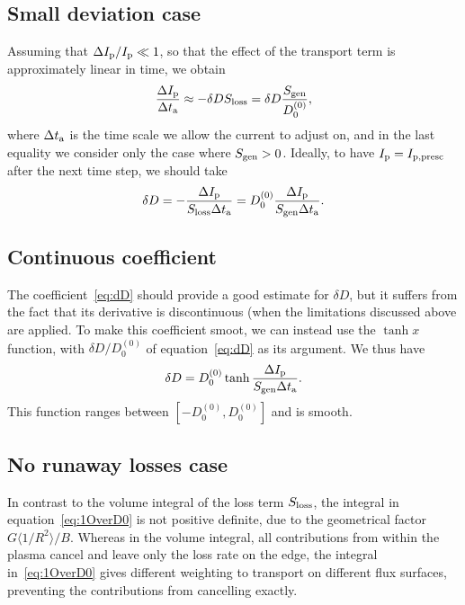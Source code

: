\documentclass{notes}
\begin{document}
	\subsection{Small deviation case}
	Assuming that $\Delta I_{\rm p}/I_{\rm p}\ll 1$, so that the effect of
	the transport term is approximately linear in time, we obtain
	\begin{equation}\label{eq:dD}
		\frac{\Delta I_{\rm p}}{\Delta t_{\rm a}}\approx
			-\delta D S_{\rm loss} = \delta D\frac{S_{\rm gen}}{D_0^{(0)}},
	\end{equation}
	where $\Delta t_{\rm a}$ is the time scale we allow the current to adjust
	on, and in the last equality we consider only the case where $S_{\rm gen}>0$.
	Ideally, to have $I_{\rm p} = I_{\rm p,presc}$ after the next time step, we
	should take
	\begin{equation}
		\delta D = -\frac{\Delta I_{\rm p}}{S_{\rm loss}\Delta t_{\rm a}} = D_0^{(0)} \frac{\Delta I_{\rm p}}{S_{\rm gen}\Delta t_{\rm a}}.
	\end{equation}

	\subsection{Continuous coefficient}
	The coefficient~\eqref{eq:dD} should provide a good estimate for $\delta D$,
	but it suffers from the fact that its derivative is discontinuous (when the
	limitations discussed above are applied. To make this coefficient smoot, we
	can instead use the $\tanh{x}$ function, with $\delta D/D_0^{(0)}$ of
	equation~\eqref{eq:dD} as its argument. We thus have
	\begin{equation}\label{eq:dD_tanh}
		\delta D = D_0^{(0)}\tanh\frac{\Delta I_{\rm p}}{S_{\rm gen}\Delta t_{\rm a}}.
	\end{equation}
	This function ranges between $[-D_0^{(0)}, D_0^{(0)}]$ and is smooth.


	\subsection{No runaway losses case}
	In contrast to the volume integral of the loss term $S_{\rm loss}$, the
	integral in equation~\eqref{eq:1OverD0} is not positive definite, due to the
	geometrical factor $G\langle 1/R^2\rangle/B$. Whereas in the volume
	integral, all contributions from within the plasma cancel and leave only the
	loss rate on the edge, the integral in~\eqref{eq:1OverD0} gives different
	weighting to transport on different flux surfaces, preventing the
	contributions from cancelling exactly.
\end{document}
